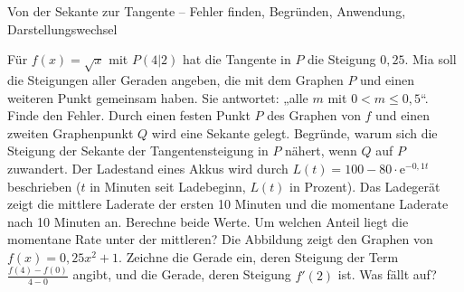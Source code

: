 \begin{aufgabe}{Von der Sekante zur Tangente – Fehler finden, Begründen, Anwendung, Darstellungswechsel}
\begin{teile}
\teil Für $f(x) = \sqrt{x}$ mit $P(4 | 2)$ hat die Tangente in $P$ die Steigung $0{,}25$. Mia soll die Steigungen aller Geraden angeben, die mit dem Graphen $P$ und einen weiteren Punkt gemeinsam haben. Sie antwortet: „alle $m$ mit $0 < m \le 0{,}5$“. Finde den Fehler.
\teil Durch einen festen Punkt $P$ des Graphen von $f$ und einen zweiten Graphenpunkt $Q$ wird eine Sekante gelegt. Begründe, warum sich die Steigung der Sekante der Tangentensteigung in $P$ nähert, wenn $Q$ auf $P$ zuwandert.
\teil Der Ladestand eines Akkus wird durch $L(t) = 100 - 80 \cdot \mathrm{e}^{-0{,}1t}$ beschrieben ($t$ in Minuten seit Ladebeginn, $L(t)$ in Prozent). Das Ladegerät zeigt die mittlere Laderate der ersten 10 Minuten und die momentane Laderate nach 10 Minuten an. Berechne beide Werte. Um welchen Anteil liegt die momentane Rate unter der mittleren?
\teil Die Abbildung zeigt den Graphen von $f(x) = 0{,}25x^2 + 1$. Zeichne die Gerade ein, deren Steigung der Term $\frac{f(4) - f(0)}{4 - 0}$ angibt, und die Gerade, deren Steigung $f'(2)$ ist. Was fällt auf?

\begin{ksys}[xmin=-1,xmax=5,ymin=-1,ymax=7,ablesen]\end{ksys}
\end{teile}
\end{aufgabe}
